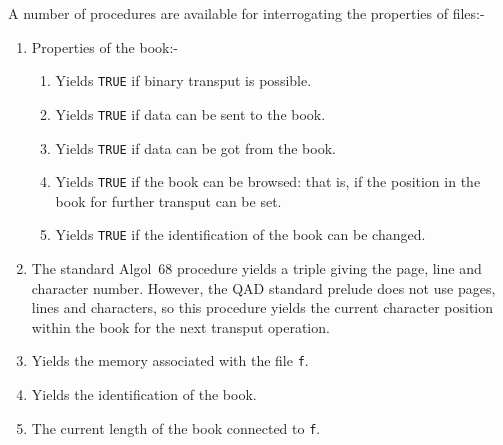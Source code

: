A number of procedures are available for interrogating the properties
of files:-
\begin{enumerate}
\item Properties of the book:-
\begin{enumerate}
\item {}\newline
Yields \verb|TRUE| if binary transput is possible.
\item {}\newline
Yields \verb|TRUE| if data can be sent to the book.
\item {}\newline
Yields \verb|TRUE| if data can be got from the book.
\item {}\newline
Yields \verb|TRUE| if the book can be browsed: that is, if the position
in the book for further transput can be set.
\item {}\newline
Yields \verb|TRUE| if the identification of the book can be changed.
\end{enumerate}
\item {}\newline
The standard Algol~68 procedure yields a triple giving the page, line
and character number. However, the QAD standard prelude does not use
pages, lines and characters, so this procedure yields the current
character position within the book for the next trans\-put operation.
\item {}\newline
Yields the memory  associated with the
file \verb|f|.
\item {}\newline
Yields the  identification of the book.
\item {}\newline
The current length of the book connected to \verb|f|.
\end{enumerate}


